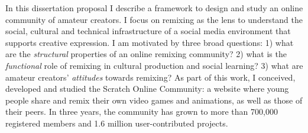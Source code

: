 


\setcounter{savepage}{\thepage}
\begin{abstractpage}
\setlength{\parskip}{0pt} %
\begin{spacing}{1}
In this dissertation proposal I describe a framework to design and study an online community of amateur creators.
I focus on remixing as the lens to understand the social, cultural and technical infrastructure of a social media environment that supports creative expression.
I am motivated by three broad questions:
1) what are the \emph{structural} properties of an online remixing community?
2) what is the \emph{functional} role of remixing in cultural production and social learning?
3) what are amateur creators' \emph{attitudes} towards remixing?
As part of this work, I conceived, developed and studied the Scratch Online Community: a website where young people share and remix their own video games and animations, as well as those of their peers.
In three years, the community has grown to more than 700,000 registered members and 1.6 million user-contributed projects.
\end{spacing}
\setlength{\parskip}{11pt plus3pt minus3pt} %
\end{abstractpage}

